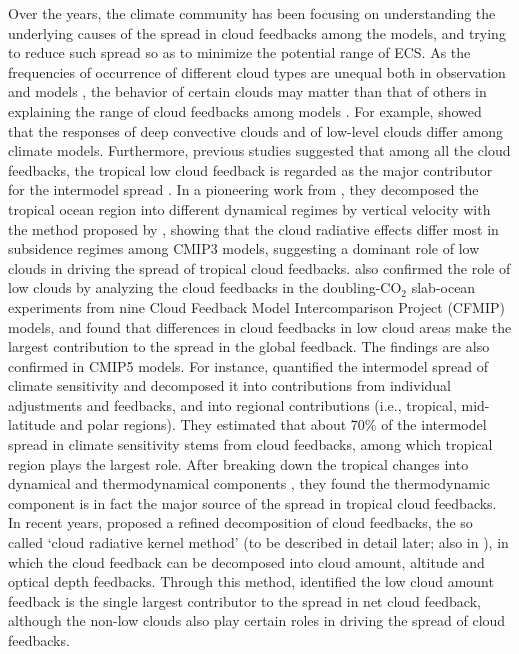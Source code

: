 Over the years, the climate community has been focusing on understanding the underlying causes of the spread in cloud feedbacks among the models, and trying to reduce such spread so as to minimize the potential range of ECS. As the frequencies of occurrence of different cloud types are unequal both in observation and models \citep[e.g.,][]{Zhang2005comparing}, the behavior of certain clouds may matter than that of others in explaining the range of cloud feedbacks among models \citep{Bony2006}. For example, \cite{Wyant2006comparison} showed that the responses of deep convective clouds and of low-level clouds differ among climate models. 
Furthermore, previous studies suggested that among all the cloud feedbacks, the tropical low cloud feedback is regarded as the major contributor for the intermodel spread 
\citep[e.g.,][]{Bony2005,Webb2006contribution,Webb2013coupling,Vial2013,Zelinka2016insights}. In a pioneering work from \cite{Bony2005}, they decomposed the tropical ocean region into different dynamical regimes by vertical velocity with the method proposed by \cite{Bony2004}, showing that the cloud radiative effects differ most in subsidence regimes among CMIP3 models, suggesting a dominant role of low clouds in driving the spread of tropical cloud feedbacks. \cite{Webb2006contribution} also confirmed the role of low clouds by analyzing the cloud feedbacks in the doubling-CO$_2$ slab-ocean experiments from nine Cloud Feedback Model Intercomparison Project (CFMIP) models, and found that differences in cloud feedbacks in low cloud areas make the largest contribution to the spread in the global feedback. The findings are also confirmed in CMIP5 models. For instance, \cite{Vial2013} quantified the intermodel spread of climate sensitivity and decomposed it into contributions from individual adjustments and feedbacks, and into regional contributions (i.e., tropical, mid-latitude and polar regions). They estimated that about 70\% of the intermodel spread in climate sensitivity stems from cloud feedbacks, among which tropical region plays the largest role. After breaking down the tropical changes into dynamical and thermodynamical components \citep[method from][]{Bony2004}, they found the thermodynamic component is in fact the major source of the spread in tropical cloud feedbacks. In recent years, \cite{Zelinka2012computing1,Zelinka2012computing2} proposed a refined decomposition of cloud feedbacks, the so called `cloud radiative kernel method' (to be described in detail later; also in ), in which the cloud feedback can be decomposed into cloud amount, altitude and optical depth feedbacks. Through this method, \cite{Zelinka2016insights} identified the low cloud amount feedback is the single largest contributor to the spread in net cloud feedback, although the non-low clouds also play certain roles in driving the spread of cloud feedbacks. 

